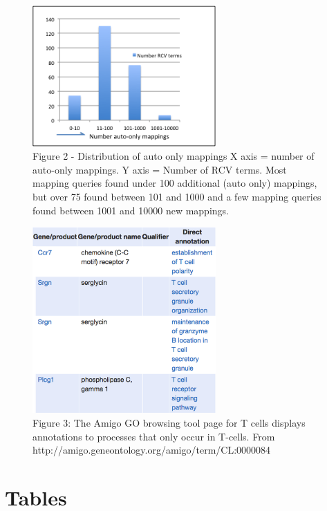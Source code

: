 \documentclass[runningheads,a4paper]{llncs}
\begin{document}
{{\begin{figure}
\centering
\includegraphics[width=70mm]{auto_only.png}
\caption{Figure 2 - Distribution of auto only mappings
X axis = number of auto-only mappings.  Y axis = Number of RCV terms.  Most mapping queries found under 100 additional (auto only) mappings, but over 75 found between 101 and 1000 and a few mapping queries found between 1001 and 10000 new mappings.}
\label{fig:auto_only}
\end{figure}

\begin{figure}
\centering
\includegraphics[width=70mm]{amigo.png}
\caption{Figure 3: The Amigo GO browsing tool page for T cells displays annotations to processes that only occur in T-cells.  From http://amigo.geneontology.org/amigo/term/CL:0000084}
\label{fig:amigo}
\end{figure}

\section{Tables}


}}
\end{document}
